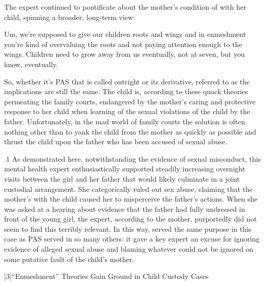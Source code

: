 \documentclass[11pt, twoside]{article}
\begin{document}
{{\nip{}%
The expert continued to pontificate about the mother’s condition of
 with her child, spinning a broader, long-term view:

\begin{blockQuote}
Um, we’re supposed to give our children roots and wings and in
enmeshment you’re kind of overvaluing the roots and not paying
attention enough to the wings. Children need to grow away from
us eventually, not at seven, but you know, eventually.
\end{blockQuote}

\nip{}%
So, whether it’s PAS that is called outright or its derivative, referred
to as  the implications are still the same. The child is,
according to these quack theories permeating the family courts, endangered by the mother’s caring and protective response to her child when
learning of the sexual violations of the child by the father. Unfortunately, in the mad world of family courts the solution is often nothing
other than to yank the child from the mother as quickly as possible
and thrust the child upon the father who has been accused of sexual
abuse.
}%

\p.1{%
As demonstrated here, notwithstanding the evidence of sexual misconduct, this mental health expert enthusiastically supported steadily
increasing overnight visits between the girl and her father that would likely
culminate in a joint custodial arrangement. She categorically ruled out
sex abuse, claiming that the mother’s  with the child
caused her to misperceive the father’s actions. When she was asked at
a hearing about evidence that the father had fully undressed in front of
the young girl, the expert, according to the mother, purportedly did not
seem to find this terribly relevant. In this way,  served the
same purpose in this case as PAS served in so many others: it gave a key
expert an excuse for ignoring evidence of alleged sexual abuse and blaming whatever could not be ignored on some putative fault of the child’s
mother.
}%


\s|3|{``Enmeshment'' Theories Gain Ground in Child Custody Cases}

}
\end{document}
